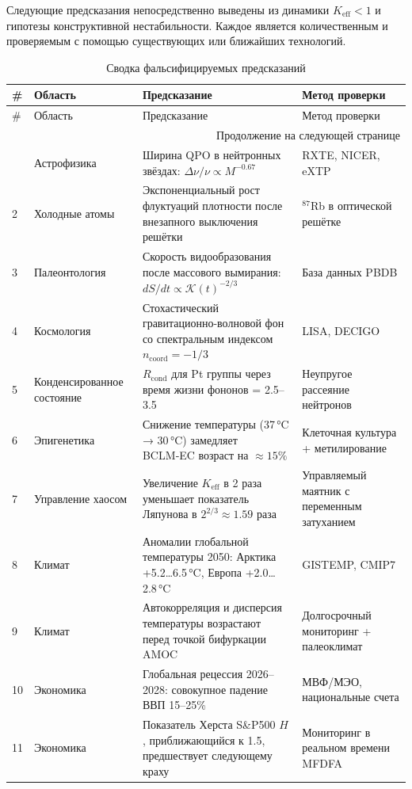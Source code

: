 \documentclass[12pt,a4paper]{article}
\newcommand{\Keff}{K_{\mathrm{eff}}}
\newcommand{\REL}{\mathcal{K}}
\begin{document}
	Следующие предсказания непосредственно выведены из динамики $\Keff < 1$ и гипотезы
	конструктивной нестабильности. Каждое является количественным и проверяемым
	с помощью существующих или ближайших технологий.
	
	\begin{longtable}{|p{2cm}|p{3cm}|p{4.5cm}|p{4cm}|}
		\caption{Сводка фальсифицируемых предсказаний}\label{tab:predictions}\\
		\hline
		\textbf{\#} & \textbf{Область} & \textbf{Предсказание} & \textbf{Метод проверки} \\
		\hline
		\endfirsthead
		\hline
		\# & Область & Предсказание & Метод проверки \\
		\hline
		\endhead
		\hline
		\multicolumn{4}{r}{Продолжение на следующей странице} \\
		\endfoot
		\hline
		\endlastfoot
		1 & Астрофизика & Ширина QPO в нейтронных звёздах: $\Delta\nu/\nu \propto M^{-0.67}$ & RXTE, NICER, eXTP \\
		2 & Холодные атомы & Экспоненциальный рост флуктуаций плотности после внезапного выключения решётки & ${}^{87}$Rb в оптической решётке \\
		3 & Палеонтология & Скорость видообразования после массового вымирания: $dS/dt \propto \REL(t)^{-2/3}$ & База данных PBDB \\
		4 & Космология & Стохастический гравитационно-волновой фон со спектральным индексом $n_{\mathrm{coord}} = -1/3$ & LISA, DECIGO \\
		5 & Конденсированное состояние & $R_{\text{cond}}$ для Pt группы через время жизни фононов = 2.5–3.5 & Неупругое рассеяние нейтронов \\
		6 & Эпигенетика & Снижение температуры (37 °C → 30 °C) замедляет BCLM‑EC возраст на $\approx 15\%$ & Клеточная культура + метилирование \\
		7 & Управление хаосом & Увеличение $\Keff$ в 2 раза уменьшает показатель Ляпунова в $2^{2/3} \approx 1.59$ раза & Управляемый маятник с переменным затуханием \\
		8 & Климат & Аномалии глобальной температуры 2050: Арктика +5.2…6.5 °C, Европа +2.0…2.8 °C & GISTEMP, CMIP7 \\
		9 & Климат & Автокорреляция и дисперсия температуры возрастают перед точкой бифуркации AMOC & Долгосрочный мониторинг + палеоклимат \\
		10 & Экономика & Глобальная рецессия 2026–2028: совокупное падение ВВП 15–25\% & МВФ/МЭО, национальные счета \\
		11 & Экономика & Показатель Херста S\&P500 $H$, приближающийся к 1.5, предшествует следующему краху & Мониторинг в реальном времени MFDFA \\
	\end{longtable}
	
\end{document}
